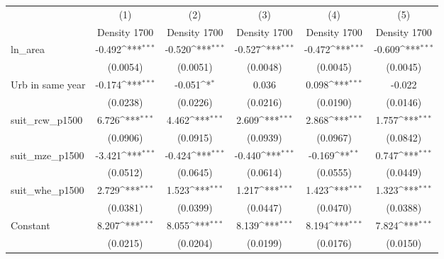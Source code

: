 {
\def\sym#1{\ifmmode^{#1}\else\(^{#1}\)\fi}
\begin{tabular}{l*{5}{c}}
\toprule
                    &\multicolumn{1}{c}{(1)}&\multicolumn{1}{c}{(2)}&\multicolumn{1}{c}{(3)}&\multicolumn{1}{c}{(4)}&\multicolumn{1}{c}{(5)}\\
                    &\multicolumn{1}{c}{Density 1700}&\multicolumn{1}{c}{Density 1700}&\multicolumn{1}{c}{Density 1700}&\multicolumn{1}{c}{Density 1700}&\multicolumn{1}{c}{Density 1700}\\
\midrule
ln\_area             &      -0.492\sym{***}&      -0.520\sym{***}&      -0.527\sym{***}&      -0.472\sym{***}&      -0.609\sym{***}\\
                    &    (0.0054)         &    (0.0051)         &    (0.0048)         &    (0.0045)         &    (0.0045)         \\
\addlinespace
Urb in same year    &      -0.174\sym{***}&      -0.051\sym{*}  &       0.036         &       0.098\sym{***}&      -0.022         \\
                    &    (0.0238)         &    (0.0226)         &    (0.0216)         &    (0.0190)         &    (0.0146)         \\
\addlinespace
suit\_rcw\_p1500      &       6.726\sym{***}&       4.462\sym{***}&       2.609\sym{***}&       2.868\sym{***}&       1.757\sym{***}\\
                    &    (0.0906)         &    (0.0915)         &    (0.0939)         &    (0.0967)         &    (0.0842)         \\
\addlinespace
suit\_mze\_p1500      &      -3.421\sym{***}&      -0.424\sym{***}&      -0.440\sym{***}&      -0.169\sym{**} &       0.747\sym{***}\\
                    &    (0.0512)         &    (0.0645)         &    (0.0614)         &    (0.0555)         &    (0.0449)         \\
\addlinespace
suit\_whe\_p1500      &       2.729\sym{***}&       1.523\sym{***}&       1.217\sym{***}&       1.423\sym{***}&       1.323\sym{***}\\
                    &    (0.0381)         &    (0.0399)         &    (0.0447)         &    (0.0470)         &    (0.0388)         \\
\addlinespace
Constant            &       8.207\sym{***}&       8.055\sym{***}&       8.139\sym{***}&       8.194\sym{***}&       7.824\sym{***}\\
                    &    (0.0215)         &    (0.0204)         &    (0.0199)         &    (0.0176)         &    (0.0150)         \\

\end{tabular}}

